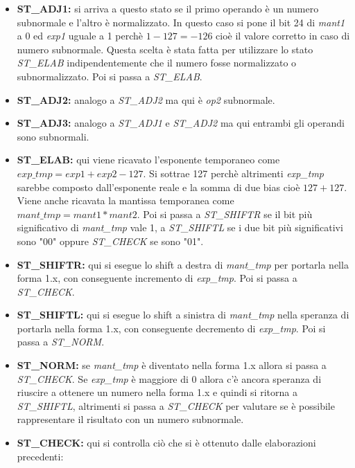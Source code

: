 \documentclass[]{IEEEtran}
\begin{document}
\begin{itemize}
    \item \textbf{ST\_ADJ1:} si arriva a questo stato se il primo operando è un numero subnormale e l'altro è normalizzato. In questo caso si pone il bit 24 di \textit{mant1} a 0 ed \textit{exp1} uguale a 1 perchè $1-127=-126$ cioè il valore corretto in caso di numero subnormale. Questa scelta è stata fatta per utilizzare lo stato \textit{ST\_ELAB} indipendentemente che il numero fosse normalizzato o subnormalizzato. Poi si passa a \textit{ST\_ELAB}.
    \item \textbf{ST\_ADJ2:} analogo a \textit{ST\_ADJ2} ma qui è \textit{op2} subnormale.
    \item \textbf{ST\_ADJ3:} analogo a \textit{ST\_ADJ1} e \textit{ST\_ADJ2} ma qui entrambi gli operandi sono subnormali.
    \item \textbf{ST\_ELAB:} qui viene ricavato l'esponente temporaneo come $exp\_tmp = exp1 + exp2 - 127$. Si sottrae 127 perchè altrimenti \textit{exp\_tmp} sarebbe composto dall'esponente reale e la somma di due bias cioè $127+127$. Viene anche ricavata la mantissa temporanea come $mant\_tmp = mant1 * mant2$. Poi si passa a \textit{ST\_SHIFTR} se il bit più significativo di \textit{mant\_tmp} vale 1, a \textit{ST\_SHIFTL} se i due bit più significativi sono "00" oppure \textit{ST\_CHECK} se sono "01".
    \item \textbf{ST\_SHIFTR:} qui si esegue lo shift a destra di \textit{mant\_tmp} per portarla nella forma 1.x, con conseguente incremento di \textit{exp\_tmp}. Poi si passa a \textit{ST\_CHECK}.
    \item \textbf{ST\_SHIFTL:} qui si esegue lo shift a sinistra di \textit{mant\_tmp} nella speranza di portarla nella forma 1.x, con conseguente decremento di \textit{exp\_tmp}. Poi si passa a \textit{ST\_NORM}.
    \item \textbf{ST\_NORM:} se \textit{mant\_tmp} è diventato nella forma 1.x allora si passa a \textit{ST\_CHECK}. Se \textit{exp\_tmp} è maggiore di 0 allora c'è ancora speranza di riuscire a ottenere un numero nella forma 1.x e quindi si ritorna a \textit{ST\_SHIFTL}, altrimenti si passa a \textit{ST\_CHECK} per valutare se è possibile rappresentare il risultato con un numero subnormale.
    \item \textbf{ST\_CHECK:} qui si controlla ciò che si è ottenuto dalle elaborazioni precedenti:

\end{itemize}
\end{document}
